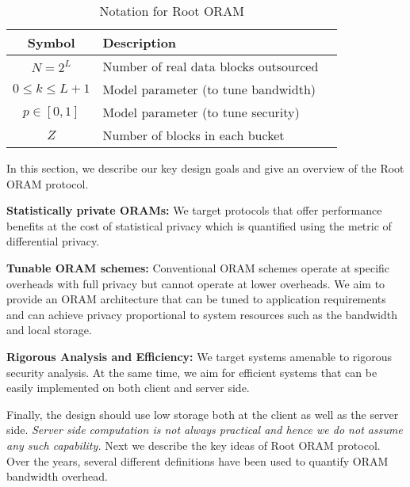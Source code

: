 \documentclass[USenglish,oneside,twocolumn]{article}
\makeatletter
\newcommand{\ourprotocol}{Root ORAM}
\let\origsection\section
\renewcommand\section{\@ifstar{\starsection}{\nostarsection}}
\newcommand\nostarsection[1]
{\sectionprelude\origsection{#1}\sectionpostlude}
\newcommand\starsection[1]
{\sectionprelude\origsection*{#1}\sectionpostlude}
\newcommand\sectionprelude{\vspace{-1em}
}
\newcommand\sectionpostlude{\vspace{-1em}
}
\let\origsubsection\subsection
\renewcommand\subsection{\@ifstar{\starsubsection}{\nostarsubsection}}
\newcommand\nostarsubsection[1]
{\subsectionprelude\origsubsection{#1}\subsectionpostlude}
\newcommand\starsubsection[1]
{\subsectionprelude\origsubsection*{#1}\subsectionpostlude}
\newcommand\subsectionprelude{\vspace{-1.5em}}
\newcommand\subsectionpostlude{\vspace{-1em}}
\makeatother
\begin{document}
 \section{\ourprotocol{} overview}\label{sec:overview}

\begin{table}[t]
\centering
\resizebox{\columnwidth}{!}
{\begin{tabular}{cll|} \toprule
Symbol  & Description \\
\midrule
$N = 2^{L}$      	 	& Number of real data blocks outsourced\\
$0 \leq k \leq L+1$    & Model parameter (to tune bandwidth)\\
$p \in [0, 1]$				& Model parameter (to tune security) \\
$Z$      		    				& Number of blocks in each bucket\\
\bottomrule 
\end{tabular}}
\caption{Notation for \ourprotocol{}}
\label{table:notationrootoram}
\end{table}




In this section, we describe our key design goals and give an overview of the \ourprotocol{} protocol.

\subsection{Design Goals}

\noindent \textbf{Statistically private ORAMs: }We target protocols that offer performance benefits at the cost of statistical privacy which is quantified using the metric of differential privacy.

\noindent \textbf{Tunable ORAM schemes: }Conventional ORAM schemes operate at specific overheads with full privacy but cannot operate at lower overheads. We aim to provide an ORAM architecture that can be tuned to application requirements and can achieve privacy proportional to system resources such as the bandwidth and local storage. 


\noindent \textbf{Rigorous Analysis and Efficiency: }We target systems amenable to rigorous security analysis. At the same time, we aim for efficient systems that can be easily implemented on both client and server side.

Finally, the design should use low storage both at the client as well as the server side. \emph{Server side computation is not always practical and hence we do not assume any such capability.} Next we describe the key ideas of \ourprotocol{} protocol. Over the years, several different definitions have been used to quantify ORAM bandwidth overhead. 
\end{document}

